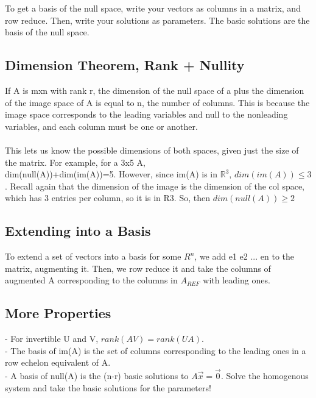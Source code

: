 \documentclass[10pt, twocolumn]{report}
\begin{document}
 To get a basis of the null space, write your vectors as columns in a matrix, and row reduce. Then, write your solutions as parameters. The basic solutions are the basis of the null space.

 \subsection{Dimension Theorem, Rank + Nullity}
 If A is mxn with rank r, the dimension of the null space of a plus the dimension of the image space of A is equal to n, the number of columns. This is because the image space corresponds to the leading variables and null to the nonleading variables, and each column must be one or another. \\\\ This lets us know the possible dimensions of both spaces, given just the size of the matrix. For example, for a 3x5 A, \\dim(null(A))+dim(im(A))=5. However, since im(A) is in $\mathbb{R}^3$, $dim(im(A)) \leq 3$. Recall again that the dimension of the image is the dimension of the col space, which has 3 entries per column, so it is in R3. So, then $dim(null(A))\geq 2$

\subsection{Extending into a Basis}
To extend a set of vectors into a basis for some $R^n$, we add e1 e2 ... en to the matrix, augmenting it. Then, we row reduce it and take the columns of augmented A corresponding to the columns in $A_{REF}$ with leading ones.
\subsection{More Properties}
- For invertible U and V, $rank (AV) = rank (UA)$.\\
- The basis of im(A) is the set of columns corresponding to the leading ones in a row echelon equivalent of A.\\
- A basis of null(A) is the (n-r) basic solutions to $A\vec x = \vec 0$. Solve the homogenous system and take the basic solutions for the parameters!
\end{document}
